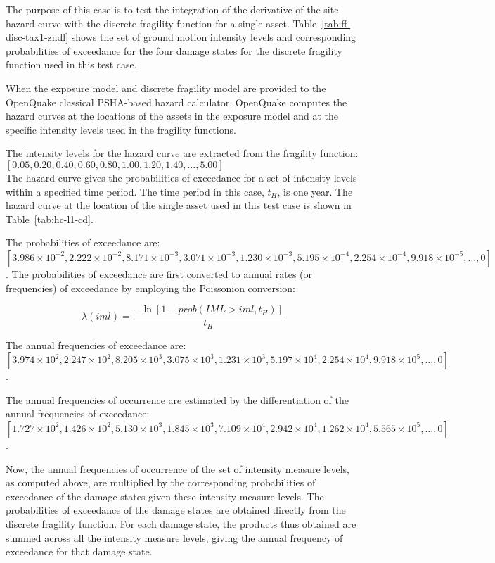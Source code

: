 The purpose of this case is to test the integration of the derivative of the site hazard curve with the discrete fragility function for a single asset. Table~\ref{tab:ff-disc-tax1-zndl} shows the set of ground motion intensity levels and corresponding probabilities of exceedance for the four damage states for the discrete fragility function used in this test case.

When the exposure model and discrete fragility model are provided to the OpenQuake classical PSHA-based hazard calculator, OpenQuake computes the hazard curves at the locations of the assets in the exposure model and at the specific intensity levels used in the fragility functions.



The intensity levels for the hazard curve are extracted from the fragility function: \\
$[0.05, 0.20, 0.40, 0.60, 0.80, 1.00, 1.20, 1.40, \dots, 5.00]$\\

The hazard curve gives the probabilities of exceedance for a set of intensity levels within a specified time period. The time period in this case, $t_H$, is one year. The hazard curve at the location of the single asset used in this test case is shown in Table~\ref{tab:hc-l1-cd}.

The probabilities of exceedance are: $[3.986\times10^{-2}, 2.222\times10^{-2}, 8.171\times10^{-3}, 3.071\times10^{-3}, 1.230\times10^{-3}, 5.195\times10^{-4}, 2.254\times10^{-4}, 9.918\times10^{-5}, \dots, 0]$. The probabilities of exceedance are first converted to annual rates (or frequencies) of exceedance by employing the Poissonion conversion:

\begin{equation}
	\lambda(iml) = \frac{-\ln [1 - prob(IML > iml, t_H)]}{t_H}
\end{equation}

The annual frequencies of exceedance are: $[3.974\times10^{2}, 2.247\times10^{2}, 8.205\times10^{3}, 3.075\times10^{3}, 1.231\times10^{3}, 5.197\times10^{4}, 2.254\times10^{4}, 9.918\times10^{5}, \dots, 0]$.

The annual frequencies of occurrence are estimated by the differentiation of the annual frequencies of exceedance: $[1.727\times10^{2}, 1.426\times10^{2}, 5.130\times10^{3}, 1.845\times10^{3}, 7.109\times10^{4}, 2.942\times10^{4}, 1.262\times10^{4}, 5.565\times10^{5}, \dots, 0]$.

Now, the annual frequencies of occurrence of the set of intensity measure levels, as computed above, are multiplied by the corresponding probabilities of exceedance of the damage states given these intensity measure levels. The probabilities of exceedance of the damage states are obtained directly from the discrete fragility function. For each damage state, the products thus obtained are summed across all the intensity measure levels, giving the annual frequency of exceedance for that damage state.

